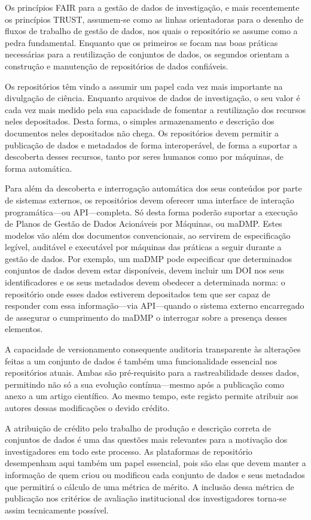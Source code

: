 \documentclass[sigconf,nonacm]{acmart}
\begin{document}
Os princípios FAIR para a gestão de dados de investigação, e mais recentemente os princípios TRUST, assumem-se como as linhas orientadoras para o desenho de fluxos de trabalho de gestão de dados, nos quais o repositório se assume como a pedra fundamental. Enquanto que os primeiros se focam nas boas práticas necessárias para a reutilização de conjuntos de dados, os segundos orientam a construção e manutenção de repositórios de dados confiáveis.

Os repositórios têm vindo a assumir um papel cada vez mais importante na divulgação de ciência. Enquanto arquivos de dados de investigação, o seu valor é cada vez mais medido pela sua capacidade de fomentar a reutilização dos recursos neles depositados. Desta forma, o simples armazenamento e descrição dos documentos neles depositados não chega. Os repositórios devem permitir a publicação de dados e metadados de forma interoperável, de forma a suportar a descoberta desses recursos, tanto por seres humanos como por máquinas, de forma automática.

Para além da descoberta e interrogação automática dos seus conteúdos por parte de sistemas externos, os repositórios devem oferecer uma interface de interação programática---ou API---completa. Só desta forma poderão suportar a execução de Planos de Gestão de Dados Acionáveis por Máquinas, ou maDMP. Estes modelos vão além dos documentos convencionais, ao servirem de especificação legível, auditável e executável por máquinas das práticas a seguir durante a gestão de dados. Por exemplo, um maDMP pode especificar que determinados conjuntos de dados devem estar disponíveis, devem incluir um DOI nos seus identificadores e os seus metadados devem obedecer a determinada norma: o repositório onde esses dados estiverem depositados tem que ser capaz de responder com essa informação---via API---quando o sistema externo encarregado de assegurar o cumprimento do maDMP o interrogar sobre a presença desses elementos.

A capacidade de versionamento consequente auditoria transparente às alterações feitas a um conjunto de dados é também uma funcionalidade essencial nos repositórios atuais. Ambas são pré-requisito para a rastreabilidade desses dados, permitindo não só a sua evolução contínua---mesmo após a publicação como anexo a um artigo científico. Ao mesmo tempo, este registo permite atribuir aos autores dessas modificações o devido crédito.

A atribuição de crédito pelo trabalho de produção e descrição correta de conjuntos de dados é uma das questões mais relevantes para a motivação dos investigadores em todo este processo. As plataformas de repositório desempenham aqui também um papel essencial, pois são elas que devem manter a informação de quem criou ou modificou cada conjunto de dados e seus metadados que permitirá o cálculo de uma métrica de mérito. A inclusão dessa métrica de publicação nos critérios de avaliação institucional dos investigadores torna-se assim tecnicamente possível.
\end{document}
